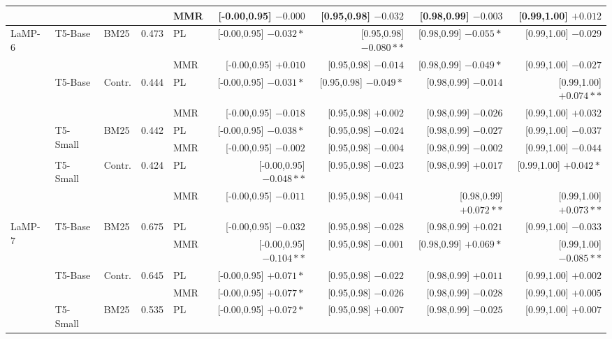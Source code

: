 \documentclass[10pt]{article}
\begin{document}
\begin{table}[p]
\begin{tabular}{@{}lllrlrrrr@{}}
 &  &  &  & MMR & [-0.00,0.95] $-0.000$ & [0.95,0.98] $-0.032$ & [0.98,0.99] $-0.003$ & [0.99,1.00] $+0.012$ \\
\midrule
\multirow{2}{*}{LaMP-6} & \multirow{2}{*}{T5-Base} & \multirow{2}{*}{BM25} & \multirow{2}{*}{0.473} & PL & [-0.00,0.95] $-0.032*$ & [0.95,0.98] $-0.080**$ & [0.98,0.99] $-0.055*$ & [0.99,1.00] $-0.029$ \\
 &  &  &  & MMR & [-0.00,0.95] $+0.010$ & [0.95,0.98] $-0.014$ & [0.98,0.99] $-0.049*$ & [0.99,1.00] $-0.027$ \\
\cmidrule(lr){1-9}
 & \multirow{2}{*}{T5-Base} & \multirow{2}{*}{Contr.} & \multirow{2}{*}{0.444} & PL & [-0.00,0.95] $-0.031*$ & [0.95,0.98] $-0.049*$ & [0.98,0.99] $-0.014$ & [0.99,1.00] $+0.074**$ \\
 &  &  &  & MMR & [-0.00,0.95] $-0.018$ & [0.95,0.98] $+0.002$ & [0.98,0.99] $-0.026$ & [0.99,1.00] $+0.032$ \\
\cmidrule(lr){1-9}
 & \multirow{2}{*}{T5-Small} & \multirow{2}{*}{BM25} & \multirow{2}{*}{0.442} & PL & [-0.00,0.95] $-0.038*$ & [0.95,0.98] $-0.024$ & [0.98,0.99] $-0.027$ & [0.99,1.00] $-0.037$ \\
 &  &  &  & MMR & [-0.00,0.95] $-0.002$ & [0.95,0.98] $-0.004$ & [0.98,0.99] $-0.002$ & [0.99,1.00] $-0.044$ \\
\cmidrule(lr){1-9}
 & \multirow{2}{*}{T5-Small} & \multirow{2}{*}{Contr.} & \multirow{2}{*}{0.424} & PL & [-0.00,0.95] $-0.048**$ & [0.95,0.98] $-0.023$ & [0.98,0.99] $+0.017$ & [0.99,1.00] $+0.042*$ \\
 &  &  &  & MMR & [-0.00,0.95] $-0.011$ & [0.95,0.98] $-0.041$ & [0.98,0.99] $+0.072**$ & [0.99,1.00] $+0.073**$ \\
\midrule
\multirow{2}{*}{LaMP-7} & \multirow{2}{*}{T5-Base} & \multirow{2}{*}{BM25} & \multirow{2}{*}{0.675} & PL & [-0.00,0.95] $-0.032$ & [0.95,0.98] $-0.028$ & [0.98,0.99] $+0.021$ & [0.99,1.00] $-0.033$ \\
 &  &  &  & MMR & [-0.00,0.95] $-0.104**$ & [0.95,0.98] $-0.001$ & [0.98,0.99] $+0.069*$ & [0.99,1.00] $-0.085**$ \\
\cmidrule(lr){1-9}
 & \multirow{2}{*}{T5-Base} & \multirow{2}{*}{Contr.} & \multirow{2}{*}{0.645} & PL & [-0.00,0.95] $+0.071*$ & [0.95,0.98] $-0.022$ & [0.98,0.99] $+0.011$ & [0.99,1.00] $+0.002$ \\
 &  &  &  & MMR & [-0.00,0.95] $+0.077*$ & [0.95,0.98] $-0.026$ & [0.98,0.99] $-0.028$ & [0.99,1.00] $+0.005$ \\
\cmidrule(lr){1-9}
 & \multirow{2}{*}{T5-Small} & \multirow{2}{*}{BM25} & \multirow{2}{*}{0.535} & PL & [-0.00,0.95] $+0.072*$ & [0.95,0.98] $+0.007$ & [0.98,0.99] $-0.025$ & [0.99,1.00] $+0.007$ \\

\end{tabular}
\end{table}
\end{document}
